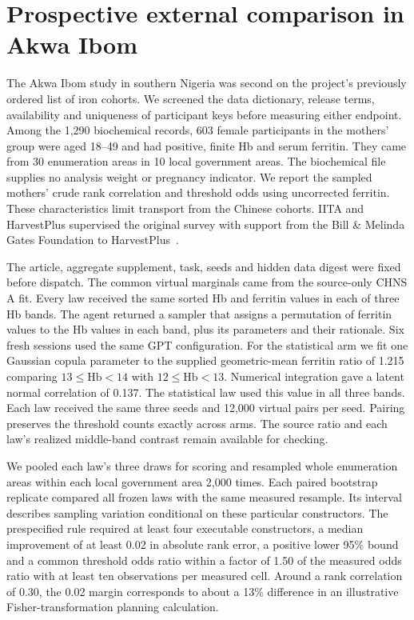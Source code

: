 \section{Prospective external comparison in Akwa Ibom}
\label{app:akwa}
The Akwa Ibom study in southern Nigeria was second on the project's previously ordered list of iron cohorts. We screened the data dictionary, release terms, availability and uniqueness of participant keys before measuring either endpoint. Among the 1,290 biochemical records, 603 female participants in the mothers' group were aged 18--49 and had positive, finite Hb and serum ferritin. They came from 30 enumeration areas in 10 local government areas. The biochemical file supplies no analysis weight or pregnancy indicator. We report the sampled mothers' crude rank correlation and threshold odds using uncorrected ferritin. These characteristics limit transport from the Chinese cohorts. IITA and HarvestPlus supervised the original survey with support from the Bill \& Melinda Gates Foundation to HarvestPlus~\cite{akwa_iron}.

The article, aggregate supplement, task, seeds and hidden data digest were fixed before dispatch. The common virtual marginals came from the source-only CHNS A fit. Every law received the same sorted Hb and ferritin values in each of three Hb bands. The agent returned a sampler that assigns a permutation of ferritin values to the Hb values in each band, plus its parameters and their rationale. Six fresh sessions used the same GPT configuration. For the statistical arm we fit one Gaussian copula parameter to the supplied geometric-mean ferritin ratio of 1.215 comparing $13\leq\mathrm{Hb}<14$ with $12\leq\mathrm{Hb}<13$. Numerical integration gave a latent normal correlation of 0.137. The statistical law used this value in all three bands. Each law received the same three seeds and 12,000 virtual pairs per seed. Pairing preserves the threshold counts exactly across arms. The source ratio and each law's realized middle-band contrast remain available for checking.

We pooled each law's three draws for scoring and resampled whole enumeration areas within each local government area 2,000 times. Each paired bootstrap replicate compared all frozen laws with the same measured resample. Its interval describes sampling variation conditional on these particular constructors. The prespecified rule required at least four executable constructors, a median improvement of at least 0.02 in absolute rank error, a positive lower 95\% bound and a common threshold odds ratio within a factor of 1.50 of the measured odds ratio with at least ten observations per measured cell. Around a rank correlation of 0.30, the 0.02 margin corresponds to about a 13\% difference in an illustrative Fisher-transformation planning calculation.

